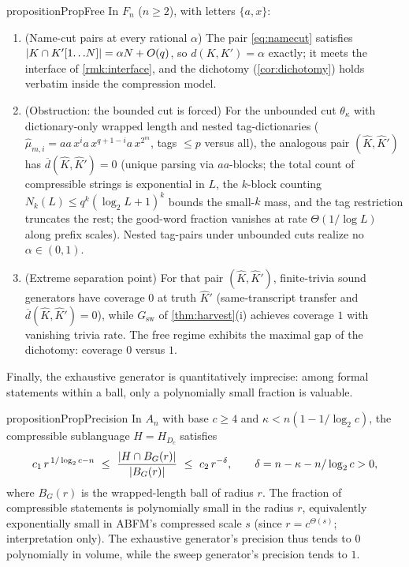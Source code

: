 \documentclass[11pt]{article}
\numberwithin{equation}{section}
\DeclarePairedDelimiter{\abs}{\lvert}{\rvert}
\newcommand{\Comp}[1]{H_{#1}}
\newcommand{\dup}[2]{\overline{d}(#1,#2)}
\newcommand{\dens}[2]{d(#1,#2)}
\newcommand{\rest}[2]{#1[1\!\dots\! #2]}
\theoremstyle{plain}
\theoremstyle{definition}
\theoremstyle{remark}
\begin{document}
\begin{restatable}{proposition}{PropFree}\label{prop:free}
In $F_n$ ($n \ge 2$), with letters $\{a, x\}$:
\begin{enumerate}[label=\textup{(\roman*)}]
  \item \textup{(Name-cut pairs at every rational $\alpha$)} The pair \eqref{eq:namecut}
    satisfies $\abs{K \cap \rest{K'}{N}} = \alpha N + O(q)$, so $\dens{K}{K'} = \alpha$
    exactly; it meets the interface of \cref{rmk:interface}, and the dichotomy
    (\cref{cor:dichotomy}) holds verbatim inside the compression model.
  \item \textup{(Obstruction: the bounded cut is forced)} For the unbounded cut
    $\theta_\kappa$ with dictionary-only wrapped length and nested tag-dictionaries
    ($\hat\mu_{m,i} = a a\, x^i a\, x^{q+1-i} a\, x^{2^m}$, tags $\le p$ versus all), the
    analogous pair $(\hat K, \hat K')$ has $\dup{\hat K}{\hat K'} = 0$ (unique parsing via
    $aa$-blocks; the total count of compressible strings is exponential in $L$, the $k$-block
    counting $N_k(L) \le q^k (\log_2 L + 1)^k$ bounds the small-$k$ mass, and the tag
    restriction truncates the rest; the good-word fraction vanishes at rate $\Theta(1/\log L)$
    along prefix scales). Nested tag-pairs under unbounded cuts realize no $\alpha \in (0,1)$.
  \item \textup{(Extreme separation point)} For that pair $(\hat K, \hat K')$, finite-trivia
    sound generators have coverage $0$ at truth $\hat K'$ (same-transcript transfer and
    $\dup{\hat K}{\hat K'} = 0$), while $G_{\mathrm{sw}}$ of \cref{thm:harvest}(i) achieves
    coverage $1$ with vanishing trivia rate. The free regime exhibits the maximal gap of the
    dichotomy: coverage $0$ versus $1$.
\end{enumerate}
\end{restatable}

Finally, the exhaustive generator is quantitatively imprecise: among formal statements within
a ball, only a polynomially small fraction is valuable.

\begin{restatable}{proposition}{PropPrecision}\label{prop:precision}
In $A_n$ with base $c \ge 4$ and $\kappa < n(1 - 1/\log_2 c)$, the compressible sublanguage $H
= \Comp{D_c}$ satisfies
\begin{equation}\label{eq:precision}
  c_1\, r^{\,1/\log_2 c - n} \ \le\ \frac{\abs{H \cap B_G(r)}}{\abs{B_G(r)}}
  \ \le\ c_2\, r^{-\delta}, \qquad \delta = n - \kappa - n/\log_2 c > 0,
\end{equation}
where $B_G(r)$ is the wrapped-length ball of radius $r$. The fraction of compressible
statements is polynomially small in the radius $r$, equivalently exponentially small in ABFM's
compressed scale $s$ (since $r = c^{\Theta(s)}$; interpretation only). The exhaustive
generator's precision thus tends to $0$ polynomially in volume, while the sweep generator's
precision tends to $1$.
\end{restatable}
\end{document}
